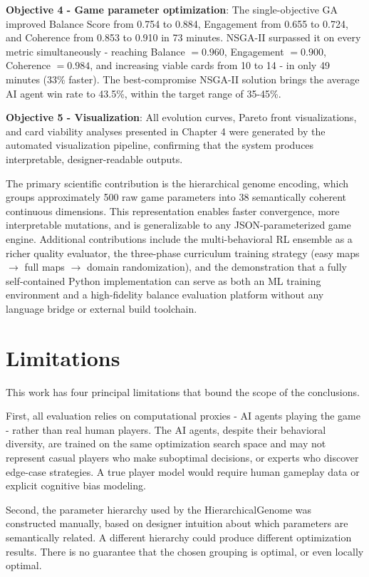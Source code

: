 \textbf{Objective 4 - Game parameter optimization}: The single-objective GA improved Balance Score from 0.754 to 0.884, Engagement from 0.655 to 0.724, and Coherence from 0.853 to 0.910 in 73 minutes. NSGA-II surpassed it on every metric simultaneously - reaching Balance $= 0.960$, Engagement $= 0.900$, Coherence $= 0.984$, and increasing viable cards from 10 to 14 - in only 49 minutes (33\% faster). The best-compromise NSGA-II solution brings the average AI agent win rate to 43.5\%, within the target range of 35-45\%.

\textbf{Objective 5 - Visualization}: All evolution curves, Pareto front visualizations, and card viability analyses presented in Chapter 4 were generated by the automated visualization pipeline, confirming that the system produces interpretable, designer-readable outputs.

The primary scientific contribution is the hierarchical genome encoding, which groups approximately 500 raw game parameters into 38 semantically coherent continuous dimensions. This representation enables faster convergence, more interpretable mutations, and is generalizable to any JSON-parameterized game engine. Additional contributions include the multi-behavioral RL ensemble as a richer quality evaluator, the three-phase curriculum training strategy (easy maps $\to$ full maps $\to$ domain randomization), and the demonstration that a fully self-contained Python implementation can serve as both an ML training environment and a high-fidelity balance evaluation platform without any language bridge or external build toolchain.

\section*{Limitations}

This work has four principal limitations that bound the scope of the conclusions.

First, all evaluation relies on computational proxies - AI agents playing the game - rather than real human players. The AI agents, despite their behavioral diversity, are trained on the same optimization search space and may not represent casual players who make suboptimal decisions, or experts who discover edge-case strategies. A true player model would require human gameplay data or explicit cognitive bias modeling.

Second, the parameter hierarchy used by the HierarchicalGenome was constructed manually, based on designer intuition about which parameters are semantically related. A different hierarchy could produce different optimization results. There is no guarantee that the chosen grouping is optimal, or even locally optimal.

